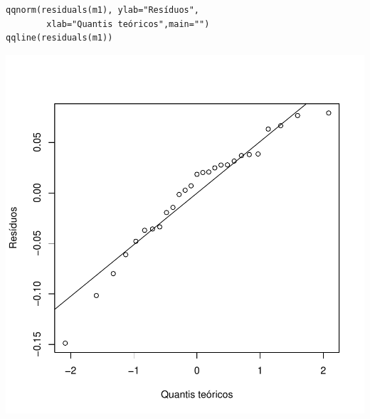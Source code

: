 \documentclass[14pt,aspectratio=1610]{beamer}
\begin{document}
% 
% 
\begin{frame}[fragile]{}
\frametitle{ }
\begin{block}{}
\justifying


\begin{verbatim}
qqnorm(residuals(m1), ylab="Resíduos",
        xlab="Quantis teóricos",main="")
qqline(residuals(m1))    
\end{verbatim}
\end{block}

\vspace{-1cm}
\begin{center}
\includegraphics{Aula4Regressao/Figuras/Aula4-028}
\end{center}
\end{frame}
\end{document}
